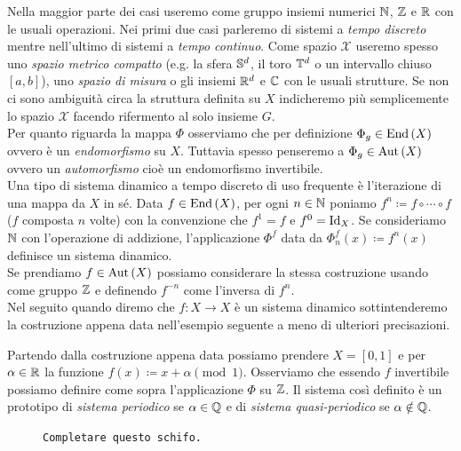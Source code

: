 Nella maggior parte dei casi useremo come gruppo insiemi numerici $ \N $, $ \Z $ e $ \R $ con le usuali operazioni. Nei primi due casi parleremo di sistemi a \emph{tempo discreto} mentre nell'ultimo di sistemi a \emph{tempo continuo}. Come spazio $ \mathcal{X} $ useremo spesso uno \emph{spazio metrico compatto} (e.g. la sfera $ \S^d $, il toro $ \T^d $ o un intervallo chiuso $ [a, b] $), uno \emph{spazio di misura} o gli insiemi $ \R^d $ e $ \C $ con le usuali strutture. Se non ci sono ambiguità circa la struttura definita su $ X $ indicheremo più semplicemente lo spazio $ \mathcal{X} $ facendo rifermento al solo insieme $ G $. \\

Per quanto riguarda la mappa $ \Phi $ osserviamo che per definizione $ \Phi_g \in \End{(X)} $ ovvero è un \emph{endomorfismo} su $ X $. Tuttavia spesso penseremo a $ \Phi_g \in \Aut{(X)} $ ovvero un \emph{automorfismo} cioè un endomorfismo invertibile. \\

Una tipo di sistema dinamico a tempo discreto di uso frequente è l'iterazione di una mappa da $ X $ in sé. Data $ f \in \End{(X)} $, per ogni $ n \in \N $ poniamo $ f^n \coloneqq f \circ \cdots \circ f $ ($ f $ composta $ n $ volte) con la convenzione che $ f^1 = f $ e $ f^0 = \Id_X $. Se consideriamo $ \N $ con l'operazione di addizione, l'applicazione $ \Phi^f $ data da $ \Phi_n^f(x) \coloneqq f^n(x) $ definisce un sistema dinamico. \\
Se prendiamo $ f \in \Aut{(X)} $ possiamo considerare la stessa costruzione usando come gruppo $ \Z $ e definendo $ f^{-n} $ come l'inversa di $ f^n $. \\
Nel seguito quando diremo che $ f \colon X \to X $ è un sistema dinamico sottintenderemo la costruzione appena data nell'esempio seguente a meno di ulteriori precisazioni. 


\begin{example}
	Partendo dalla costruzione appena data possiamo prendere $ X = [0, 1] $ e per $ \alpha \in \R $ la funzione $ f(x) \coloneqq x + \alpha \pmod{1} $. Osserviamo che essendo $ f $ invertibile possiamo definire come sopra l'applicazione $ \Phi $ su $ \Z $. Il sistema così definito è un prototipo di \emph{sistema periodico} se $ \alpha \in \Q $ e di \emph{sistema quasi-periodico} se $ \alpha \notin \Q $. 
	\iffigureon
	\begin{figure}[h!]
		\centering
		
		\caption{\texttt{Completare questo schifo.}}
	\end{figure}
	\fi
\end{example}

